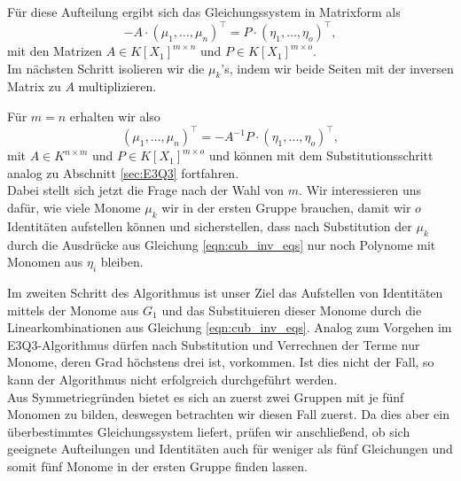 \documentclass[a4paper,oneside, 11pt, openany%
]{article}
\theoremstyle{custom}
\theoremstyle{custom}
\begin{document}
Für diese Aufteilung ergibt sich das Gleichungssystem in Matrixform als
\begin{equation}
	-A \cdot \left(\mu_1,\ldots,\mu_n\right)^{\top} = P \cdot \left(\eta_1,\ldots,\eta_{o}\right)^{\top},
\end{equation}
mit den Matrizen $A \in K[X_1]^{m \times n}$ und $P \in K[X_1]^{m \times o}$.\\
Im nächsten Schritt isolieren wir die $\mu_k$'s, indem wir beide Seiten mit der inversen Matrix zu $A$ multiplizieren.

Für $m = n$ erhalten wir also 
\begin{equation}\label{eqn:cub_inv_eqs}
	\left(\mu_1,\ldots,\mu_n\right)^{\top} = -A^{-1} P \cdot \left(\eta_1,\ldots,\eta_{o}\right)^{\top},
\end{equation}
mit $A \in K^{n \times m}$ und $P \in K[X_1]^{m \times o}$
und können mit dem Substitutionsschritt analog zu Abschnitt \ref{sec:E3Q3} fortfahren.\\

Dabei stellt sich jetzt die Frage nach der Wahl von $m$.
Wir interessieren uns dafür, wie viele Monome $\mu_{k}$ wir in der ersten Gruppe brauchen, damit wir $o$ Identitäten aufstellen können und sicherstellen, dass nach Substitution der $\mu_{k}$ durch die Ausdrücke aus Gleichung \eqref{eqn:cub_inv_eqs} nur noch Polynome mit Monomen aus $\eta_{i}$ bleiben.\newline

Im zweiten Schritt des Algorithmus ist unser Ziel das Aufstellen von Identitäten mittels der Monome aus $G_1$ und das Substituieren dieser Monome durch die Linearkombinationen aus Gleichung \eqref{eqn:cub_inv_eqs}. Analog zum Vorgehen im E3Q3-Algorithmus dürfen nach Substitution und Verrechnen der Terme nur Monome, deren Grad höchstens drei ist, vorkommen. Ist dies nicht der Fall, so kann der Algorithmus nicht erfolgreich durchgeführt werden.\\
 
 Aus Symmetriegründen bietet es sich an zuerst zwei Gruppen mit je fünf Monomen zu bilden, deswegen betrachten wir diesen Fall zuerst. Da dies aber ein überbestimmtes Gleichungssystem liefert, prüfen wir anschließend, ob sich geeignete Aufteilungen und Identitäten auch für weniger als fünf Gleichungen und somit fünf Monome in der ersten Gruppe finden lassen.
\end{document}
